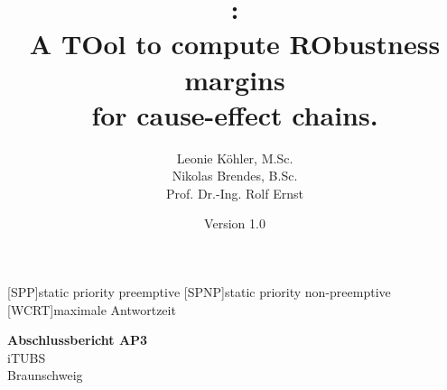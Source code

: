 \documentclass[11pt, a4paper, openany]{article}
\newcommand{\Tool}{
\textbf{\textsc{\rmfamily{Toro}}}\xspace}
\begin{document}
 

\begin{acronym}[ECU]
[SPP]{static priority preemptive}
[SPNP]{static priority non-preemptive}
[WCRT]{maximale Antwortzeit}
\end{acronym}


\newcommand{\EqSize}{\small}			%
\newcommand{\AlgSize}{\small}			%
\newcommand{\LstSize}{\scriptsize}			%
\preto\align{\par\nobreak\EqSize\noindent}
\preto\equation{\par\nobreak\EqSize\noindent}
\preto\algorithmic{\par\nobreak\AlgSize\noindent}

\begin{titlepage}
\pagestyle{plain}

\title{\Tool: \\
\LARGE{A TOol to compute RObustness margins}\\ 
\LARGE{for cause-effect chains}.}
\author{
Leonie Köhler, M.Sc.\\%
Nikolas Brendes, B.Sc. \\
Prof. Dr.-Ing. Rolf Ernst}
\date{Version 1.0}
\maketitle 
\thispagestyle{empty}


\begin{flushright}

\Large\textbf{Abschlussbericht AP3}
\\[1cm]
\large
iTUBS \\ Braunschweig 
\end{flushright} 


\end{titlepage}

\pagestyle{plain}

\tableofcontents
\clearpage
\clearpage
\pagestyle{fancyplain}




\newpage

\newpage

\newpage
%


\pagestyle{plain}



\appendix
\end{document}
